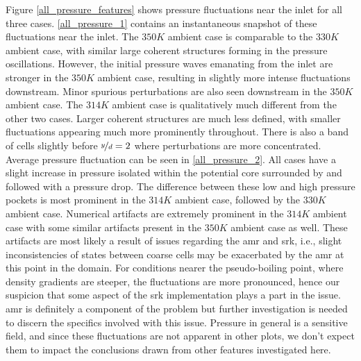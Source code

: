 Figure \ref{all_pressure_features} shows pressure fluctuations near the inlet for all three cases. \ref{all_pressure_1} contains an instantaneous snapshot of these fluctuations near the inlet. The $350 K$ ambient case is comparable to the $330 K$ ambient case, with similar large coherent structures forming in the pressure oscillations. However, the initial pressure waves emanating from the inlet are stronger in the $350 K$ ambient case, resulting in slightly more intense fluctuations downstream. Minor spurious perturbations are also seen downstream in the $350 K$ ambient case. The $314 K$ ambient case is qualitatively much different from the other two cases. Larger coherent structures are much less defined, with smaller fluctuations appearing much more prominently throughout. There is also a band of cells slightly before $\nicefrac{y}{d}=2$ where perturbations are more concentrated. Average pressure fluctuation can be seen in \ref{all_pressure_2}. All cases have a slight increase in pressure isolated within the potential core surrounded by and followed with a pressure drop. The difference between these low and high pressure pockets is most prominent in the $314 K$ ambient case, followed by the $330 K$ ambient case. Numerical artifacts are extremely prominent in the $314 K$ ambient case with some similar artifacts present in the $350 K$ ambient case as well. These artifacts are most likely a result of issues regarding the \gls{amr} and \gls{srk}, i.e., slight inconsistencies of states between coarse cells may be exacerbated by the \gls{amr} at this point in the domain. For conditions nearer the pseudo-boiling point, where density gradients are steeper, the fluctuations are more pronounced, hence our suspicion that some aspect of the \gls{srk} implementation plays a part in the issue. \gls{amr} is definitely a component of the problem but further investigation is needed to discern the specifics involved with this issue. Pressure in general is a sensitive field, and since these fluctuations are not apparent in other plots, we don't expect them to impact the conclusions drawn from other features investigated here.  

